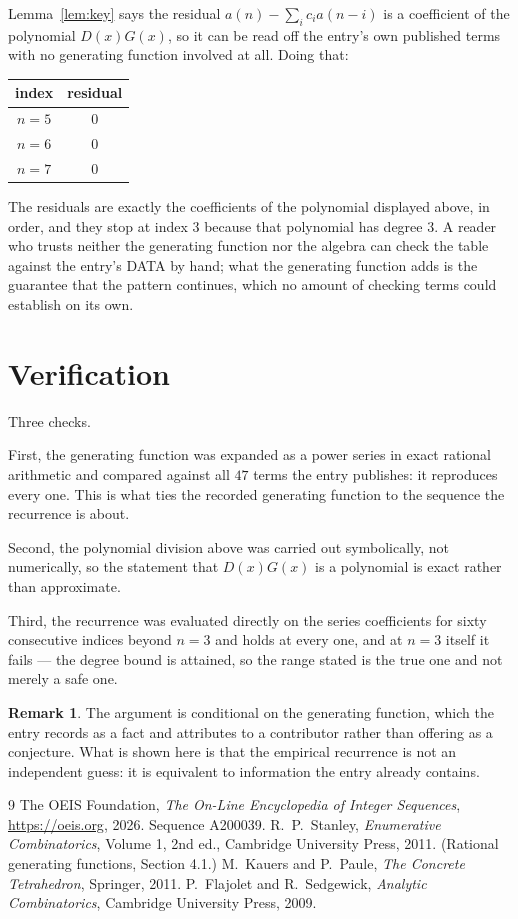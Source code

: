 \documentclass[11pt,a4paper]{article}
\theoremstyle{plain}
\theoremstyle{definition}
\newtheorem{remark}[theorem]{Remark}
\begin{document}
Lemma~\ref{lem:key} says the residual $a(n)-\sum_ic_ia(n-i)$ is a coefficient of the
polynomial $D(x)G(x)$, so it can be read off the entry's own published terms with no
generating function involved at all. Doing that:
\begin{center}
\begin{tabular}{cc}
index & residual \\ \hline
$n=5$ & $0$ \\
$n=6$ & $0$ \\
$n=7$ & $0$
\end{tabular}
\end{center}
The residuals are exactly the coefficients of the polynomial displayed above, in order, and
they stop at index $3$ because that polynomial has degree $3$. A reader who trusts
neither the generating function nor the algebra can check the table against the entry's DATA
by hand; what the generating function adds is the guarantee that the pattern continues, which
no amount of checking terms could establish on its own.

\section{Verification}

Three checks.

First, the generating function was expanded as a power series in exact rational arithmetic and
compared against all $47$ terms the entry publishes: it reproduces every one. This is
what ties the recorded generating function to the sequence the recurrence is about.

Second, the polynomial division above was carried out symbolically, not numerically, so the
statement that $D(x)G(x)$ is a polynomial is exact rather than approximate.

Third, the recurrence was evaluated directly on the series coefficients for sixty consecutive
indices beyond $n=3$ and holds at every one, and at $n=3$ itself it fails --- the
degree bound is attained, so the range stated is the true one and not merely a safe one.

\begin{remark}
The argument is conditional on the generating function, which the entry records as a fact and
attributes to a contributor rather than offering as a conjecture. What is shown here is that
the empirical recurrence is not an independent guess: it is equivalent to information the
entry already contains.
\end{remark}

\begin{thebibliography}{9}
 The OEIS Foundation, \emph{The On-Line Encyclopedia of Integer
Sequences}, \url{https://oeis.org}, 2026. Sequence A200039.
 R.~P.~Stanley, \emph{Enumerative Combinatorics}, Volume 1, 2nd ed.,
Cambridge University Press, 2011. (Rational generating functions, Section 4.1.)
 M.~Kauers and P.~Paule, \emph{The Concrete Tetrahedron}, Springer, 2011.
 P.~Flajolet and R.~Sedgewick, \emph{Analytic Combinatorics}, Cambridge
University Press, 2009.
\end{thebibliography}
\end{document}
